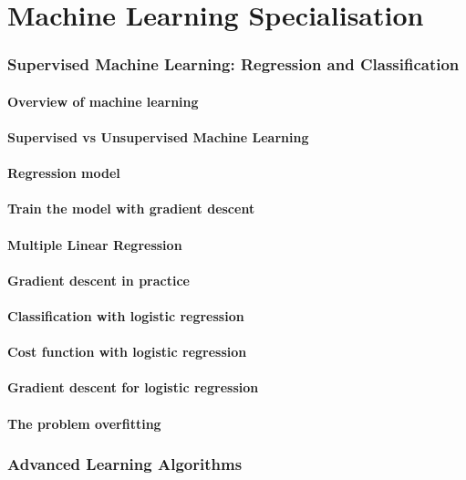 \part{Machine Learning Specialisation}

\section{Supervised Machine Learning: Regression and Classification}
\subsection{Overview of machine learning}
\subsection{Supervised vs Unsupervised Machine Learning}
\subsection{Regression model}
\subsection{Train the model with gradient descent}
\subsection{Multiple Linear Regression}
\subsection{Gradient descent in practice}
\subsection{Classification with logistic regression}
\subsection{Cost function with logistic regression}
\subsection{Gradient descent for logistic regression}
\subsection{The problem overfitting}

\section{Advanced Learning Algorithms}
